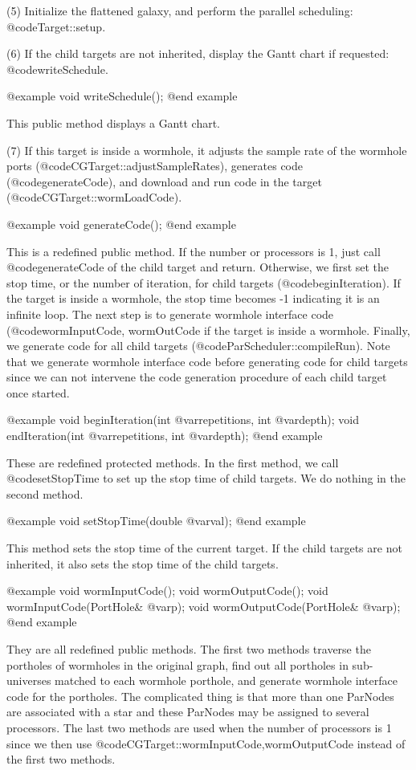(5) Initialize the flattened galaxy, and perform the parallel scheduling:
@code{Target::setup}.

(6) If the child targets are not inherited, display the Gantt chart if
requested: @code{writeSchedule}.

@example
void writeSchedule();
@end example

This public method displays a Gantt chart.

(7) If this target is inside a wormhole, it adjusts the sample rate of the
wormhole ports (@code{CGTarget::adjustSampleRates}), generates code
(@code{generateCode}), and download and run code in the target
(@code{CGTarget::wormLoadCode}).

@example
void generateCode();
@end example

This is a redefined public method.  If the number or processors is 1,
just call @code{generateCode} of the child target and return. 
Otherwise, we first
set the stop time, or the number of iteration, for child targets
(@code{beginIteration}). If the target is inside a wormhole,
the stop time becomes -1 indicating it is an infinite loop.
The next step is to generate wormhole interface code
(@code{wormInputCode, wormOutCode} if the target is inside a wormhole.
Finally, we generate code for all child targets 
(@code{ParScheduler::compileRun}).
Note that we generate wormhole interface code before generating code
for child targets since  we can not intervene the code generation procedure of
each child target once started.

@example
void beginIteration(int @var{repetitions}, int @var{depth});
void endIteration(int @var{repetitions}, int @var{depth});
@end example

These are redefined protected methods. In the first method, we call
@code{setStopTime} to set up the stop time of child targets.
We do nothing in the second method.

@example
void setStopTime(double @var{val});
@end example

This method sets the stop time of the current target. If the child
targets are not inherited, it also sets the stop time of the
child targets.

@example
void wormInputCode();
void wormOutputCode();
void wormInputCode(PortHole& @var{p});
void wormOutputCode(PortHole& @var{p});
@end example

They are all redefined public methods. The first two methods traverse
the portholes of wormholes in the original graph, find out all
portholes in sub-universes matched to each wormhole porthole, and generate
wormhole interface code for the portholes.
The complicated thing is that
more than one ParNodes are associated with a star and these ParNodes
may be assigned to several processors.
The last two methods are used when the number of processors is 1 since we
then use @code{CGTarget::wormInputCode,wormOutputCode} instead of the first
two methods.
 
